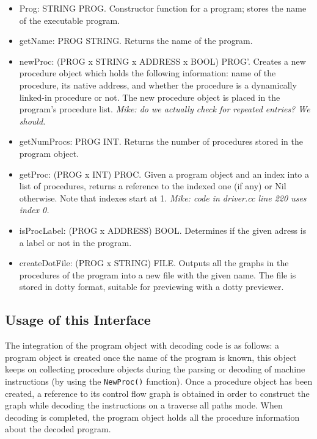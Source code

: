 \begin{itemize}
\item Prog: STRING \ra PROG.
    Constructor function for a program; stores the name of the
    executable program. 

\item getName: PROG \ra STRING.
    Returns the name of the program.

\item newProc: (PROG x STRING x ADDRESS x BOOL) \ra PROG'.
    Creates a new procedure object which holds the following 
    information: name of the procedure, its native address, and
    whether the procedure is a dynamically linked-in procedure or not.
    The new procedure object is placed in the program's procedure
    list.
    \emph{Mike: do we actually check for repeated entries? We should.}

\item getNumProcs: PROG \ra INT.
    Returns the number of procedures stored in the program object.

\item getProc: (PROG x INT) \ra PROC.
    Given a program object and an index into a list of procedures,
    returns a reference to the indexed one (if any) or Nil otherwise.
    Note that indexes start at 1.
    \emph{Mike: code in driver.cc line 220 uses index 0.}

\item isProcLabel: (PROG x ADDRESS) \ra BOOL.
    Determines if the given adress is a label or not in the program.

\item createDotFile: (PROG x STRING) \ra FILE.
    Outputs all the graphs in the procedures of the program into a new
    file with the given name.  The file is stored in dotty format, 
    suitable for previewing with a dotty previewer. 
\end{itemize} 
 
 
 
\subsection{Usage of this Interface} 

The integration of the program object with decoding code is
as follows: a program object is created once the name of 
the program is known, this object keeps on collecting procedure
objects during the parsing or decoding of machine instructions 
(by using the \texttt{NewProc()} function).  Once a procedure
object has been created, a reference to its control flow graph
is obtained in order to construct the graph while decoding
the instructions on a traverse all paths mode.  When decoding
is completed, the program object holds all the procedure 
information about the decoded program.


